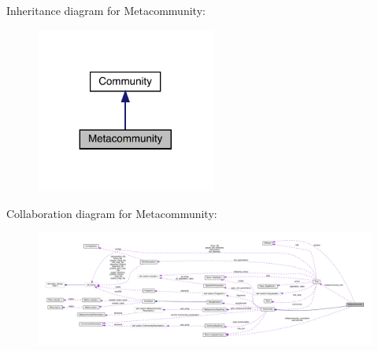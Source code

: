 Inheritance diagram for Metacommunity\+:
\nopagebreak
\begin{figure}[H]
\begin{center}
\leavevmode
\includegraphics[width=167pt]{class_metacommunity__inherit__graph}
\end{center}
\end{figure}


Collaboration diagram for Metacommunity\+:
\nopagebreak
\begin{figure}[H]
\begin{center}
\leavevmode
\includegraphics[width=350pt]{class_metacommunity__coll__graph}
\end{center}
\end{figure}
